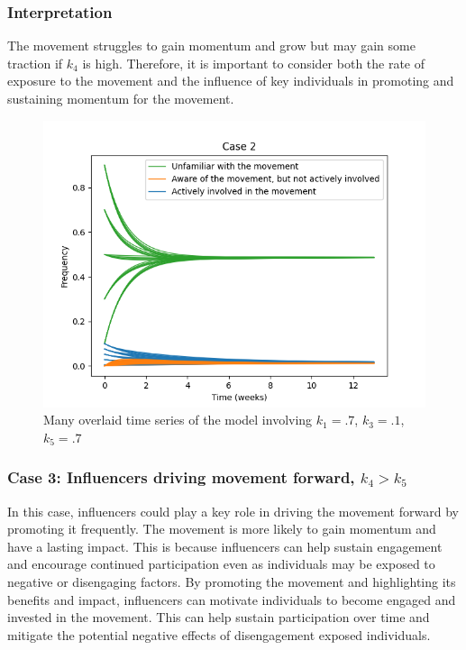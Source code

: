 \documentclass{article}
\begin{document}
    \subsubsection*{Interpretation} The movement  struggles to gain momentum and grow but may gain some traction if $k_4$ is high. Therefore, it is important to consider both the rate of exposure to the movement and the influence of key individuals in promoting and sustaining momentum for the movement.
    \begin{figure}[H]

        \centering
        \includegraphics[width=\textwidth]{simulation/plots/case2-lowk4.png}   
        \caption{Many overlaid time series of the model involving \mbox{$k_1=.7$}, \mbox{$k_3=.1$}, \mbox{$k_5=.7$}}
        \label{fig:case2_lowk4}
    \end{figure}
    
    \subsubsection*{Case 3: Influencers driving movement forward, $k_4 > k_5$} \normalfont
 
     In this case, influencers could play a key role in driving the movement forward by promoting it frequently. The movement is more likely to gain momentum and have a lasting impact. This is because influencers can help sustain engagement and encourage continued participation even as individuals may be exposed to negative or disengaging factors. By promoting the movement and highlighting its benefits and impact, influencers can motivate individuals to become engaged and invested in the movement. This can help sustain participation over time and mitigate the potential negative effects of disengagement  exposed individuals.
\end{document}
